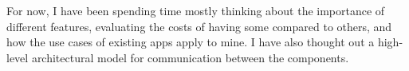\linebreak
For now, I have been spending time mostly thinking about the importance of different features, evaluating the costs of having some compared to others, and how the use cases of existing apps apply to mine.
I have also thought out a high-level architectural model for communication between the components.